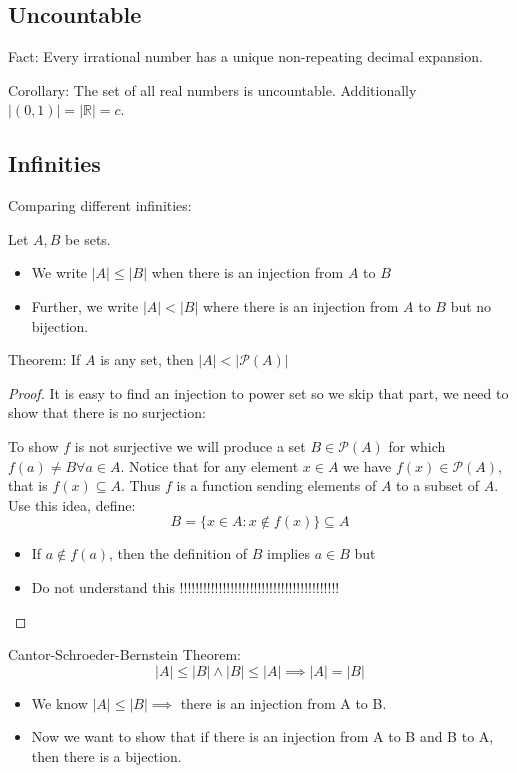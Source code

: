 \documentclass[letterpaper,12pt]{article}
\begin{document}
\subsection{Uncountable}
Fact: Every irrational number has a unique non-repeating decimal expansion. 

Corollary: The set of all real numbers is uncountable. Additionally $|(0,1)|=|\mathbb{R}|=c$. 

\subsection{Infinities}
Comparing different infinities:

Let $A, B$ be sets.\begin{itemize}
    \item We write $|A|\le|B|$ when there is an injection from $A$ to $B$
    \item Further, we write $|A|<|B|$ where there is an injection from $A$ to $B$ but no bijection.
\end{itemize}

Theorem: If $A$ is any set, then $|A|<|\mathcal{P}(A)|$
\begin{proof}
    It is easy to find an injection to power set so we skip that part, we need to show that there is no surjection:

    To show $f$ is not surjective we will produce a set $B\in\mathcal{P}(A)$ for which $f(a)\neq B\forall a\in A$. Notice that for any element $x\in A$ we have $f(x)\in \mathcal{P}(A)$, that is $f(x)\subseteq A$. Thus $f$ is a function sending elements of $A$ to a subset of $A$. Use this idea, define:\[B=\{x\in A: x\not\in f(x)\}\subseteq A\]
    \begin{itemize}
        \item If $a\not \in f(a)$, then the definition of $B$ implies $a\in B$ but 
        \item Do not understand this !!!!!!!!!!!!!!!!!!!!!!!!!!!!!!!!!!!!!!!!!
    \end{itemize}
\end{proof}

Cantor-Schroeder-Bernstein Theorem: \[|A|\le |B| \land |B|\le |A| \implies |A|=|B|\]
\begin{itemize}
    \item We know $|A|\le|B|\implies$ there is an injection from A to B.
    \item Now we want to show that if there is an injection from A to B and B to A, then there is a bijection. 
\end{itemize}
\end{document}

